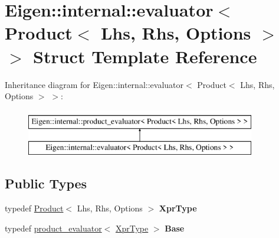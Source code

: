 \hypertarget{struct_eigen_1_1internal_1_1evaluator_3_01_product_3_01_lhs_00_01_rhs_00_01_options_01_4_01_4}{}\section{Eigen\+::internal\+::evaluator$<$ Product$<$ Lhs, Rhs, Options $>$ $>$ Struct Template Reference}
\label{struct_eigen_1_1internal_1_1evaluator_3_01_product_3_01_lhs_00_01_rhs_00_01_options_01_4_01_4}
Inheritance diagram for Eigen\+::internal\+::evaluator$<$ Product$<$ Lhs, Rhs, Options $>$ $>$\+:\begin{figure}[H]
\begin{center}
\leavevmode
\includegraphics[height=2.000000cm]{struct_eigen_1_1internal_1_1evaluator_3_01_product_3_01_lhs_00_01_rhs_00_01_options_01_4_01_4}
\end{center}
\end{figure}
\subsection*{Public Types}
\begin{DoxyCompactItemize}
\item 
\mbox{\label{struct_eigen_1_1internal_1_1evaluator_3_01_product_3_01_lhs_00_01_rhs_00_01_options_01_4_01_4_ab72c78379221b9e9e6645a552732c621}} 
typedef \mbox{\hyperlink{class_eigen_1_1_product}{Product}}$<$ Lhs, Rhs, Options $>$ {\bfseries Xpr\+Type}
\item 
\mbox{\label{struct_eigen_1_1internal_1_1evaluator_3_01_product_3_01_lhs_00_01_rhs_00_01_options_01_4_01_4_aad17bf5234d6b476580590abbac9ebd2}} 
typedef \mbox{\hyperlink{struct_eigen_1_1internal_1_1product__evaluator}{product\+\_\+evaluator}}$<$ \mbox{\hyperlink{class_eigen_1_1_product}{Xpr\+Type}} $>$ {\bfseries Base}
\end{DoxyCompactItemize}
